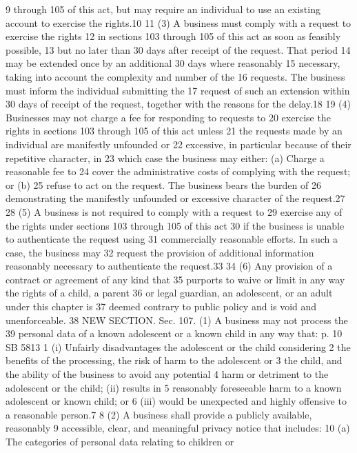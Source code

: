 9 through 105 of this act, but may require an individual to use an
existing account to exercise the rights.10
11 (3) A business must comply with a request to exercise the rights
12 in sections 103 through 105 of this act as soon as feasibly possible,
13 but no later than 30 days after receipt of the request. That period
14 may be extended once by an additional 30 days where reasonably
15 necessary, taking into account the complexity and number of the
16 requests. The business must inform the individual submitting the
17 request of such an extension within 30 days of receipt of the
request, together with the reasons for the delay.18
19 (4) Businesses may not charge a fee for responding to requests to
20 exercise the rights in sections 103 through 105 of this act unless
21 the requests made by an individual are manifestly unfounded or
22 excessive, in particular because of their repetitive character, in
23 which case the business may either: (a) Charge a reasonable fee to
24 cover the administrative costs of complying with the request; or (b)
25 refuse to act on the request. The business bears the burden of
26 demonstrating the manifestly unfounded or excessive character of the
request.27
28 (5) A business is not required to comply with a request to
29 exercise any of the rights under sections 103 through 105 of this act
30 if the business is unable to authenticate the request using
31 commercially reasonable efforts. In such a case, the business may
32 request the provision of additional information reasonably necessary
to authenticate the request.33
34 (6) Any provision of a contract or agreement of any kind that
35 purports to waive or limit in any way the rights of a child, a parent
36 or legal guardian, an adolescent, or an adult under this chapter is
37 deemed contrary to public policy and is void and unenforceable.
38 NEW SECTION. Sec. 107. (1) A business may not process the
39 personal data of a known adolescent or a known child in any way that:
p. 10 SB 5813
1 (i) Unfairly disadvantages the adolescent or the child considering
2 the benefits of the processing, the risk of harm to the adolescent or
3 the child, and the ability of the business to avoid any potential
4 harm or detriment to the adolescent or the child; (ii) results in
5 reasonably foreseeable harm to a known adolescent or known child; or
6 (iii) would be unexpected and highly offensive to a reasonable
person.7
8 (2) A business shall provide a publicly available, reasonably
9 accessible, clear, and meaningful privacy notice that includes:
10 (a) The categories of personal data relating to children or

